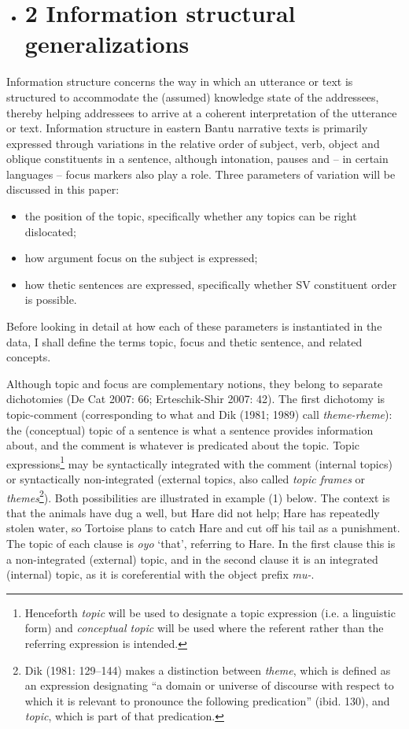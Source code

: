 \documentclass[output=paper]{langsci/langscibook}
\begin{document}
\begin{itemize}
\item \chapter{2  Information structural generalizations}\end{itemize}

Information structure concerns the way in which an utterance or text is structured to accommodate the (assumed) knowledge state of the addressees, thereby helping addressees to arrive at a coherent interpretation of the utterance or text. Information structure in eastern Bantu narrative texts is primarily expressed through variations in the relative order of subject, verb, object and oblique constituents in a sentence, although intonation, pauses and – in certain languages – focus markers also play a role. Three parameters of variation will be discussed in this paper:

\begin{itemize}
\item the position of the topic, specifically whether any topics can be right dislocated;
\item how argument focus on the subject is expressed;
\item how thetic sentences are expressed, specifically whether SV constituent order is possible.
\end{itemize}

Before looking in detail at how each of these parameters is instantiated in the data, I shall define the terms topic, focus and thetic sentence, and related concepts.

Although topic and focus are complementary notions, they belong to separate dichotomies (De Cat 2007: 66; Erteschik-Shir 2007: 42). The first dichotomy is topic-comment (corresponding to what \citet{Halliday1967} and Dik (1981; 1989) call \textit{theme-rheme}): the (conceptual) topic of a sentence is what a sentence provides information about, and the comment is whatever is predicated about the topic. Topic expressions\footnote{Henceforth \textit{topic} will be used to designate a topic expression (i.e. a linguistic form) and \textit{conceptual topic} will be used where the referent rather than the referring expression is intended.} may be syntactically integrated with the comment (internal topics) or syntactically non-integrated (external topics, also called \textit{topic frames} or \textit{themes}\footnote{Dik (1981: 129–144) makes a distinction between \textit{theme}, which is defined as an expression designating “a domain or universe of discourse with respect to which it is relevant to pronounce the following predication” (ibid. 130), and \textit{topic}, which is part of that predication.}). Both possibilities are illustrated in example (1) below. The context is that the animals have dug a well, but Hare did not help; Hare has repeatedly stolen water, so Tortoise plans to catch Hare and cut off his tail as a punishment. The topic of each clause is \emph{oyo} ‘that’, referring to Hare. In the first clause this is a non-integrated (external) topic, and in the second clause it is an integrated (internal) topic, as it is coreferential with the object prefix \emph{mu}\emph{\nobreakdash-}.
\end{document}
